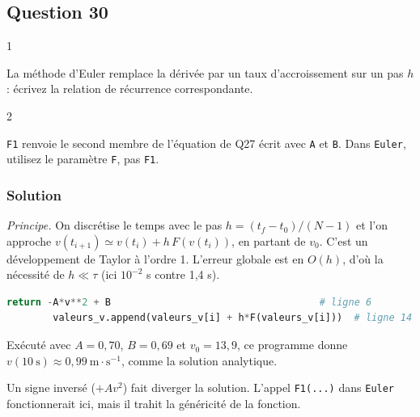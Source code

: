 \documentclass[11pt,a4paper]{article}
\begin{document}
\hypertarget{question-30}{%
\subsection{Question 30}\label{question-30}}

\begin{indication}{1}

La méthode d'Euler remplace la dérivée par un taux d'accroissement sur un pas \(h\) : écrivez la relation de récurrence correspondante.

\end{indication}

\begin{indication}{2}

\texttt{F1} renvoie le second membre de l'équation de Q27 écrit avec \texttt{A} et \texttt{B}. Dans \texttt{Euler}, utilisez le paramètre \texttt{F}, pas \texttt{F1}.

\end{indication}

\hypertarget{solution-29}{%
\subsubsection{Solution}\label{solution-29}}

\emph{Principe.} On discrétise le temps avec le pas \(h = (t_f - t_0)/(N-1)\) et l'on approche \(v(t_{i+1}) \simeq v(t_i) + h\,F(v(t_i))\), en partant de \(v_0\). C'est un développement de Taylor à l'ordre 1. L'erreur globale est en \(O(h)\), d'où la nécessité de \(h \ll \tau\) (ici \(10^{-2}\) s contre 1,4 s).

\begin{lstlisting}[language=Python]
    return -A*v**2 + B                                    # ligne 6
        valeurs_v.append(valeurs_v[i] + h*F(valeurs_v[i]))  # ligne 14
\end{lstlisting}

Exécuté avec \(A = 0{,}70\), \(B = 0{,}69\) et \(v_0 = 13{,}9\), ce programme donne \(v(10\ \mathrm s) \approx 0{,}99\ \mathrm{m\cdot s^{-1}}\), comme la solution analytique.

\begin{piege}

Un signe inversé (\(+Av^2\)) fait diverger la solution. L'appel \texttt{F1(...)} dans \texttt{Euler} fonctionnerait ici, mais il trahit la généricité de la fonction.

\end{piege}
\end{document}
